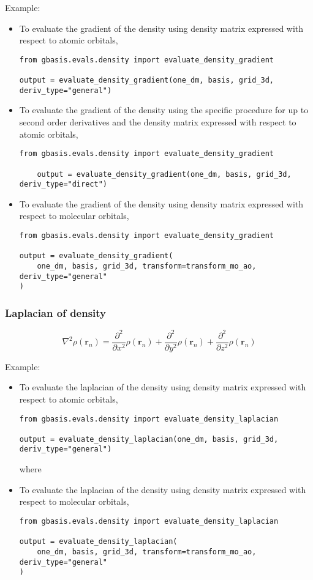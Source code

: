 \documentclass[letterpaper]{article}
\begin{document}
Example:
\begin{itemize}
\item To evaluate the gradient of the density using density matrix expressed
  with respect to atomic orbitals,
  \begin{lstlisting}[xleftmargin=-25pt]
from gbasis.evals.density import evaluate_density_gradient

output = evaluate_density_gradient(one_dm, basis, grid_3d, deriv_type="general")
\end{lstlisting}
\item To evaluate the gradient of the density using the specific procedure for up to second order derivatives and the density matrix expressed
with respect to atomic orbitals,
\begin{lstlisting}[xleftmargin=-25pt]
	from gbasis.evals.density import evaluate_density_gradient

	output = evaluate_density_gradient(one_dm, basis, grid_3d, deriv_type="direct")
\end{lstlisting}
\item To evaluate the gradient of the density using density matrix expressed
  with respect to molecular orbitals,
  \begin{lstlisting}[xleftmargin=-25pt]
from gbasis.evals.density import evaluate_density_gradient

output = evaluate_density_gradient(
    one_dm, basis, grid_3d, transform=transform_mo_ao, deriv_type="general"
)
\end{lstlisting}
\end{itemize}
\subsubsection{Laplacian of density}
\begin{equation}
  \nabla^2 \rho(\mathbf{r}_n)
  =
  \frac{\partial^2}{\partial x^2} \rho(\mathbf{r}_n)
  + \frac{\partial^2}{\partial y^2} \rho(\mathbf{r}_n)
  + \frac{\partial^2}{\partial z^2} \rho(\mathbf{r}_n)
\end{equation}

Example:
\begin{itemize}
\item To evaluate the laplacian of the density using density matrix expressed
  with respect to atomic orbitals,
  \begin{lstlisting}[xleftmargin=-25pt]
from gbasis.evals.density import evaluate_density_laplacian

output = evaluate_density_laplacian(one_dm, basis, grid_3d, deriv_type="general")
\end{lstlisting}
  where
\item To evaluate the laplacian of the density using density matrix expressed
  with respect to molecular orbitals,
  \begin{lstlisting}[xleftmargin=-25pt]
from gbasis.evals.density import evaluate_density_laplacian

output = evaluate_density_laplacian(
    one_dm, basis, grid_3d, transform=transform_mo_ao, deriv_type="general"
)
\end{lstlisting}
\end{itemize}
\end{document}
